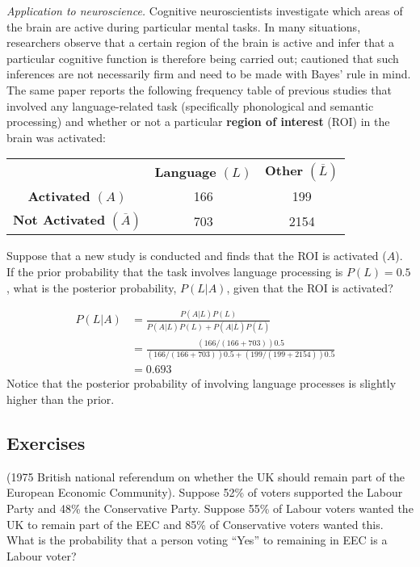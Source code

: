 \begin{Example}
\textit{Application to neuroscience.}
Cognitive neuroscientists investigate which areas of the brain are active during particular mental tasks. In many situations, researchers observe that a certain region of the brain is active and infer that a particular cognitive function is therefore being carried out; \cite{BDA_Poldrack} cautioned that such inferences are not necessarily firm and need to be made with Bayes' rule in mind. The same paper reports the following frequency table of previous studies that involved any language-related task (specifically phonological and semantic processing) and whether or not a particular \textbf{region of interest} (ROI) in the brain was activated:

\begin{center}
 \begin{tabular}{ccc} 
 $ $& \textbf{\textrm{Language}} $(L)$& \textbf{Other} $(\overline{L})$\\ [0.5ex] 
 \textbf{Activated} $(A)$ & 166 & 199  \\ 
  \textbf{Not Activated} $(\overline{A})$ & 703 & 2154 \\ [1ex] 
\end{tabular}
\end{center}
Suppose that a new study is conducted and finds that the ROI is activated ($A$). If the prior probability that the task involves language processing is $P(L)=0.5$, what is the posterior probability, $P(L|A)$, given that the ROI is activated?

\begin{equation*}
\begin{aligned}
P(L|A)&= \frac{P(A|L) P(L)}{P(A|L) P(L) + P(A | \overline{L}) P(\overline{L}) }& \\
                     &= \frac{(166/(166+703))0.5}{(166/(166+703))0.5 + (199/(199+2154))0.5 } & \\
							       &= 0.693 &
\end{aligned}
\end{equation*}
Notice that the posterior probability of involving language processes is slightly higher than the prior.
\end{Example}

\subsection*{Exercises}
\begin{Exercise}%
\label{ex1.4.1}
(1975 British national referendum on whether the UK should remain part of the European Economic Community). Suppose 52\% of voters supported the Labour Party and 48\% the Conservative Party. Suppose 55\% of Labour voters wanted the UK to remain part of the EEC and 85\% of Conservative voters wanted this. What is the probability that a person voting ``Yes'' to remaining in EEC is a Labour voter?	\cite{BDA_H}				
\end{Exercise} 

